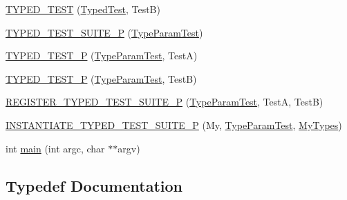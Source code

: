 \begin{DoxyCompactItemize}
\mbox{\hyperlink{_obj__test_2lib_2googletest-master_2googletest_2test_2googletest-list-tests-unittest___8cc_a1ac7e35f3d659458b18cc29d71ed1f46}{T\+Y\+P\+E\+D\+\_\+\+T\+E\+ST}} (\mbox{\hyperlink{class_typed_test}{Typed\+Test}}, TestB)
\item 
\mbox{\hyperlink{_obj__test_2lib_2googletest-master_2googletest_2test_2googletest-list-tests-unittest___8cc_a8ee0021cbd9bdfcb7c02ce2607805dfc}{T\+Y\+P\+E\+D\+\_\+\+T\+E\+S\+T\+\_\+\+S\+U\+I\+T\+E\+\_\+P}} (\mbox{\hyperlink{class_type_param_test}{Type\+Param\+Test}})
\item 
\mbox{\hyperlink{_obj__test_2lib_2googletest-master_2googletest_2test_2googletest-list-tests-unittest___8cc_aadd51dfff9d63b5e0faa0130697684c1}{T\+Y\+P\+E\+D\+\_\+\+T\+E\+S\+T\+\_\+P}} (\mbox{\hyperlink{class_type_param_test}{Type\+Param\+Test}}, TestA)
\item 
\mbox{\hyperlink{_obj__test_2lib_2googletest-master_2googletest_2test_2googletest-list-tests-unittest___8cc_a667494b5b0e4418064679f58c546db97}{T\+Y\+P\+E\+D\+\_\+\+T\+E\+S\+T\+\_\+P}} (\mbox{\hyperlink{class_type_param_test}{Type\+Param\+Test}}, TestB)
\item 
\mbox{\hyperlink{_obj__test_2lib_2googletest-master_2googletest_2test_2googletest-list-tests-unittest___8cc_a24c35f734ffc5235cc3881d22717d506}{R\+E\+G\+I\+S\+T\+E\+R\+\_\+\+T\+Y\+P\+E\+D\+\_\+\+T\+E\+S\+T\+\_\+\+S\+U\+I\+T\+E\+\_\+P}} (\mbox{\hyperlink{class_type_param_test}{Type\+Param\+Test}}, TestA, TestB)
\item 
\mbox{\hyperlink{_obj__test_2lib_2googletest-master_2googletest_2test_2googletest-list-tests-unittest___8cc_afbb047642153cc08001200d1c24f278a}{I\+N\+S\+T\+A\+N\+T\+I\+A\+T\+E\+\_\+\+T\+Y\+P\+E\+D\+\_\+\+T\+E\+S\+T\+\_\+\+S\+U\+I\+T\+E\+\_\+P}} (My, \mbox{\hyperlink{class_type_param_test}{Type\+Param\+Test}}, \mbox{\hyperlink{googletest-master_2googletest_2test_2googletest-list-tests-unittest___8cc_a16f58cd49c18568802322bbaf9f3f654}{My\+Types}})
\item 
int \mbox{\hyperlink{_obj__test_2lib_2googletest-master_2googletest_2test_2googletest-list-tests-unittest___8cc_a3c04138a5bfe5d72780bb7e82a18e627}{main}} (int argc, char $\ast$$\ast$argv)
\end{DoxyCompactItemize}


\subsection{Typedef Documentation}
\mbox{\label{_obj__test_2lib_2googletest-master_2googletest_2test_2googletest-list-tests-unittest___8cc_a16f58cd49c18568802322bbaf9f3f654}} 
